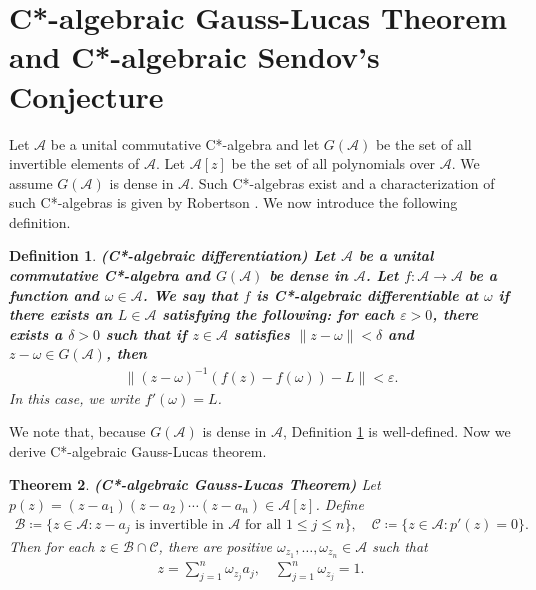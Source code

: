 \documentclass{amsart}
\newtheorem{theorem}{Theorem}[section]
\newtheorem{definition}[theorem]{Definition}
\begin{document}
\section{C*-algebraic Gauss-Lucas Theorem and C*-algebraic Sendov's Conjecture}
Let $\mathcal{A}$	be a unital commutative C*-algebra and let $G(\mathcal{A})$ be the set of all invertible elements of $\mathcal{A}$. Let $\mathcal{A}[z]$ be the set of all polynomials over $\mathcal{A}$. We assume $G(\mathcal{A})$ is dense in $\mathcal{A}$. Such C*-algebras exist and a characterization of such C*-algebras is given by Robertson  \cite{ROBERTSON}. We now introduce the following definition.
\begin{definition}\label{CDIFFE}
\textbf{(C*-algebraic differentiation) Let $\mathcal{A}$	be a unital commutative C*-algebra and $G(\mathcal{A})$ be  dense in $\mathcal{A}$. Let $f: \mathcal{A}\to \mathcal{A}$ be a function and $\omega\in \mathcal{A}$. We say that	$f$ is C*-algebraic differentiable at $\omega$ if there exists an $L\in \mathcal{A}$ satisfying the following:  for each $\varepsilon>0$, there exists a $\delta>0$ such that if $z\in \mathcal{A}$ satisfies $\|z-\omega\|<\delta$ and $z-\omega\in G(\mathcal{A})$, then 
\begin{align*}
	\|(z-\omega)^{-1}(f(z)-f(\omega))-L\|<\varepsilon.
\end{align*}}
In this case, we write $f'(\omega)=L$.
\end{definition}
We note that, because $G(\mathcal{A})$ is  dense in $\mathcal{A}$, Definition \ref{CDIFFE} is well-defined. Now we derive C*-algebraic Gauss-Lucas theorem. 
\begin{theorem}
\textbf{(C*-algebraic Gauss-Lucas Theorem)} Let $p(z)=(z-a_1)(z-a_2)\cdots (z-a_n)\in\mathcal{A}[z]$. 	Define 
\begin{align*}
	\mathcal{B}\coloneqq \{z \in \mathcal{A}: z-a_j \text{ is  invertible in }  \mathcal{A} \text{ for all } 1\leq j \leq n\}, \quad 	\mathcal{C}\coloneqq \{z \in \mathcal{A}: p'(z)=0\}.	
\end{align*}
 Then for each $z \in \mathcal{B}\cap  \mathcal{C}$, there are positive $\omega_{z_1}, \dots, \omega_{z_n} \in  \mathcal{A}$ such that 
\begin{align}\label{CONVEX}
	z=\sum_{j=1}^{n}\omega_{z_j}a_j, \quad \sum_{j=1}^{n}\omega_{z_j}=1.
\end{align}
\end{theorem}
\end{document}

